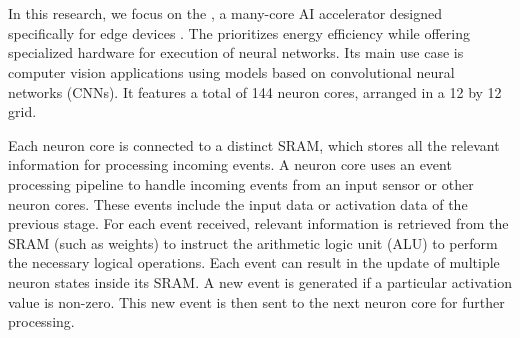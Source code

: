 \section{\graicore{}}
In this research, we focus on the \graicore{}, a many-core AI accelerator designed specifically for edge devices \cite{moreiraNeuronFlowNeuromorphicProcessor2020}.
The \graicore{} prioritizes energy efficiency while offering specialized hardware for execution of neural networks. 
Its main use case is computer vision applications using models based on convolutional neural networks (CNNs).
It features a total of 144 neuron cores, arranged in a 12 by 12 grid.


Each neuron core is connected to a distinct SRAM, which stores all the relevant information for processing incoming events.
A neuron core uses an event processing pipeline to handle incoming events from an input sensor or other neuron cores.
These events include the input data or activation data of the previous stage.
For each event received, relevant information is retrieved from the SRAM (such as weights) to instruct the arithmetic logic unit (ALU) to perform the necessary logical operations.
Each event can result in the update of multiple neuron states inside its SRAM.
A new event is generated if a particular activation value is non-zero.
This new event is then sent to the next neuron core for further processing.

